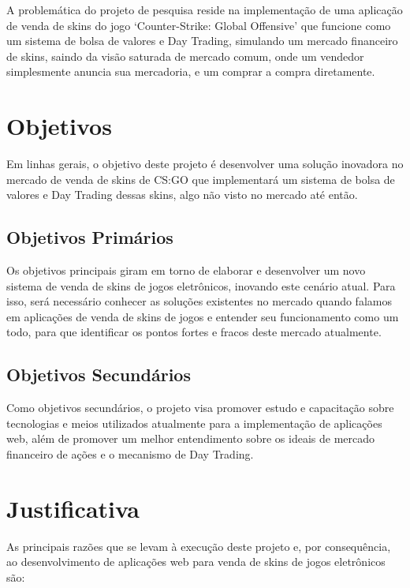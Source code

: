 A problemática do projeto de pesquisa reside na implementação de uma aplicação de venda de skins do jogo ‘Counter-Strike: Global Offensive’ que funcione como um sistema de bolsa de valores e Day Trading, simulando um mercado financeiro de skins, saindo da visão saturada de mercado comum, onde um vendedor simplesmente anuncia sua mercadoria, e um comprar a compra diretamente.

\section{Objetivos}
Em linhas gerais, o objetivo deste projeto é desenvolver uma solução inovadora no mercado de venda de skins de CS:GO que implementará um sistema de bolsa de valores e Day Trading dessas skins, algo não visto no mercado até então.

\subsection{Objetivos Primários}
Os objetivos principais giram em torno de elaborar e desenvolver um novo sistema de venda de skins de jogos eletrônicos, inovando este cenário atual. Para isso, será necessário conhecer as soluções existentes no mercado quando falamos em aplicações de venda de skins de jogos e entender seu funcionamento como um todo, para que identificar os pontos fortes e fracos deste mercado atualmente.

\subsection{Objetivos Secundários}
Como objetivos secundários, o projeto visa promover estudo e capacitação sobre tecnologias e meios utilizados atualmente para a implementação de aplicações web, além de promover um melhor entendimento sobre os ideais de mercado financeiro de ações e o mecanismo de Day Trading.

\section{Justificativa}
As principais razões que se levam à execução deste projeto e, por consequência, ao desenvolvimento de aplicações web para venda de skins de jogos eletrônicos são: 

